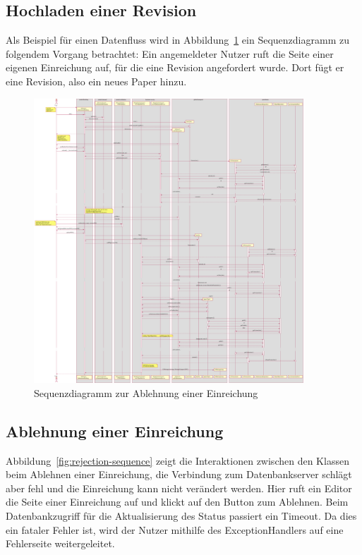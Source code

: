 
\subsection{Hochladen einer Revision}\label{subsec:sequenz-revision-hochladen}

Als Beispiel für einen Datenfluss wird in Abbildung~\ref{fig:upload-revision-sequence} ein Sequenzdiagramm zu folgendem Vorgang betrachtet:
Ein angemeldeter Nutzer ruft die Seite einer eigenen Einreichung auf, für die eine Revision angefordert wurde.
Dort fügt er eine Revision, also ein neues Paper hinzu.

\begin{figure}[H]
    \centering
    \includegraphics[width=0.9\textwidth]{graphics/upload_revision}
    \caption{Sequenzdiagramm zur Ablehnung einer Einreichung}
    \label{fig:upload-revision-sequence}
\end{figure}

\subsection{Ablehnung einer Einreichung}\label{subsec:sequenz-ablehnung}

Abbildung~\ref{fig:rejection-sequence} zeigt die Interaktionen zwischen den Klassen beim Ablehnen einer Einreichung, die Verbindung zum Datenbankserver schlägt aber fehl und die Einreichung kann nicht verändert werden.
Hier ruft ein Editor die Seite einer Einreichung auf und klickt auf den Button zum Ablehnen.
Beim Datenbankzugriff für die Aktualisierung des Status passiert ein Timeout.
Da dies ein fataler Fehler ist, wird der Nutzer mithilfe des ExceptionHandlers auf eine Fehlerseite weitergeleitet.

